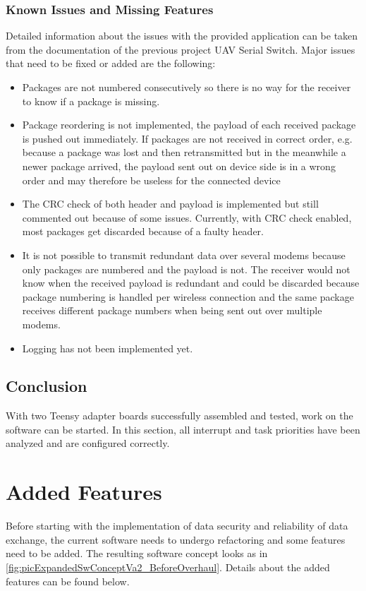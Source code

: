 \subsubsection{Known Issues and Missing Features}
Detailed information about the issues with the provided application can be taken from the documentation of the previous project UAV Serial Switch. Major issues that need to be fixed or added are the following: \begin{itemize}
    \item Packages are not numbered consecutively so there is no way for the receiver to know if a package is missing.
    \item Package reordering is not implemented, the payload of each received package is pushed out immediately. If packages are not received in correct order, e.g. because a package was lost and then retransmitted but in the meanwhile a newer package arrived, the payload sent out on device side is in a wrong order and may therefore be useless for the connected device
    \item The CRC check of both header and payload is implemented but still commented out because of some issues. Currently, with CRC check enabled, most packages get discarded because of a faulty header.
    \item It is not possible to transmit redundant data over several modems because only packages are numbered and the payload is not. The receiver would not know when the received payload is redundant and could be discarded because package numbering is handled per wireless connection and the same package receives different package numbers when being sent out over multiple modems.
    \item Logging has not been implemented yet.
\end{itemize}
%
\subsection{Conclusion}
With two Teensy adapter boards successfully assembled and tested, work on the software can be started. In this section, all interrupt and task priorities have been analyzed and are configured correctly.
%
%
%
%
%
%
%
%
%
\section{Added Features} \label{sec:txtAddedFeatures}
Before starting with the implementation of data security and reliability of data exchange, the current software needs to undergo refactoring and some features need to be added. The resulting software concept looks as in \autoref{fig:picExpandedSwConceptVa2_BeforeOverhaul}. Details about the added features can be found below.
%
%
